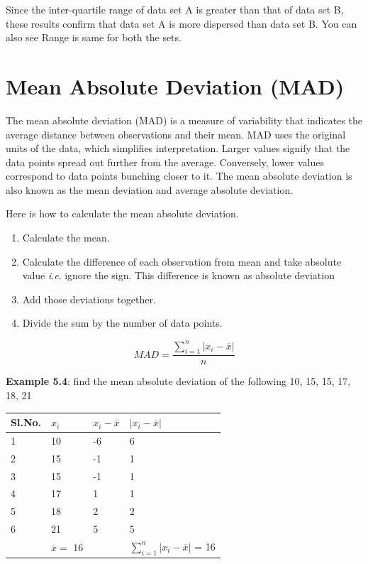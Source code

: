 \documentclass[
]{book}
\begin{document}
Since the inter-quartile range of data set A is greater than that of
data set B, these results confirm that data set A is more dispersed than
data set B. You can also see Range is same for both the sets.

\hypertarget{mean-absolute-deviation-mad}{%
\section{Mean Absolute Deviation (MAD)}\label{mean-absolute-deviation-mad}}

The mean absolute deviation (MAD) is a measure of variability that
indicates the average distance between observations and their mean. MAD
uses the original units of the data, which simplifies interpretation.
Larger values signify that the data points spread out further from the
average. Conversely, lower values correspond to data points bunching
closer to it. The mean absolute deviation is also known as the mean
deviation and average absolute deviation.

Here is how to calculate the mean absolute deviation.

\begin{enumerate}
\def\labelenumi{\arabic{enumi}.}
\item
  Calculate the mean.
\item
  Calculate the difference of each observation from mean and take
  absolute value \emph{i}.\emph{e}. ignore the sign. This difference is known as
  absolute deviation
\item
  Add those deviations together.
\item
  Divide the sum by the number of data points.
\end{enumerate}

\[MAD = \frac{\sum_{i = 1}^{n}\left| x_{i} - \overline{x} \right|}{n}\]

\textbf{Example 5.4}: find the mean absolute deviation of the following 10, 15,
15, 17, 18, 21

\begin{longtable}[]{@{}llll@{}}
\toprule
Sl.No. & \(x_{i}\) & \(x_{i} - \overline{x}\) & \(\left| x_{i} - \overline{x} \right|\) \\
\midrule
\endhead
1 & 10 & -6 & 6 \\
2 & 15 & -1 & 1 \\
3 & 15 & -1 & 1 \\
4 & 17 & 1 & 1 \\
5 & 18 & 2 & 2 \\
6 & 21 & 5 & 5 \\
& \(\overline{x} =\) 16 & & \(\sum_{i = 1}^{n}\left| x_{i} - \overline{x} \right|\) = 16 \\
\bottomrule
\end{longtable}
\end{document}
